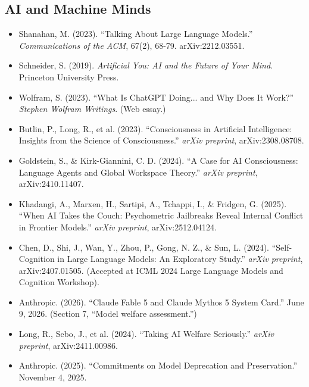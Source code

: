 \documentclass[11pt,letterpaper]{article}
\begin{document}
\subsection*{AI and Machine Minds}
\begin{itemize}[leftmargin=1.5em]
  \item Shanahan, M. (2023). ``Talking About Large Language Models.'' \textit{Communications of the ACM}, 67(2), 68-79. arXiv:2212.03551.
  \item Schneider, S. (2019). \textit{Artificial You: AI and the Future of Your Mind}. Princeton University Press.
  \item Wolfram, S. (2023). ``What Is ChatGPT Doing... and Why Does It Work?'' \textit{Stephen Wolfram Writings}. (Web essay.)
  \item Butlin, P., Long, R., et al. (2023). ``Consciousness in Artificial Intelligence: Insights from the Science of Consciousness.'' \textit{arXiv preprint}, arXiv:2308.08708.
  \item Goldstein, S., \& Kirk-Giannini, C. D. (2024). ``A Case for AI Consciousness: Language Agents and Global Workspace Theory.'' \textit{arXiv preprint}, arXiv:2410.11407.
  \item Khadangi, A., Marxen, H., Sartipi, A., Tchappi, I., \& Fridgen, G. (2025). ``When AI Takes the Couch: Psychometric Jailbreaks Reveal Internal Conflict in Frontier Models.'' \textit{arXiv preprint}, arXiv:2512.04124.
  \item Chen, D., Shi, J., Wan, Y., Zhou, P., Gong, N. Z., \& Sun, L. (2024). ``Self-Cognition in Large Language Models: An Exploratory Study.'' \textit{arXiv preprint}, arXiv:2407.01505. (Accepted at ICML 2024 Large Language Models and Cognition Workshop).
  \item Anthropic. (2026). ``Claude Fable 5 and Claude Mythos 5 System Card.'' June 9, 2026. (Section 7, ``Model welfare assessment.'')
  \item Long, R., Sebo, J., et al. (2024). ``Taking AI Welfare Seriously.'' \textit{arXiv preprint}, arXiv:2411.00986.
  \item Anthropic. (2025). ``Commitments on Model Deprecation and Preservation.'' November 4, 2025.
\end{itemize}
\end{document}
